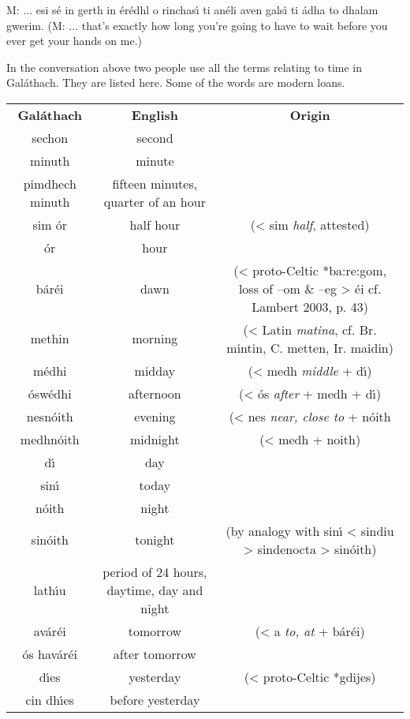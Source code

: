 M: ... esi s\'{e} in gerth in \'{e}r\'{e}dhl o rinchas\'{\i} ti an\'{e}li aven gals\'{\i} ti \'{a}dha to dhalam gwerim.
(M: ... that’s exactly how long you’re going to have to wait before you ever get your hands on me.)


In the conversation above two people use all the terms relating to time in Gal\'{a}thach. They are listed here. Some of the words are modern loans.

\begin{table}[H]
\centering
\begin{tabular}{ccc}
  \toprule
  \textbf{Gal\'{a}thach} & \textbf{English} & \textbf{Origin}\\
  \cmidrule(lr){1-1}\cmidrule(lr){2-2}\cmidrule(lr){3-3}
  sechon & second & \\
  minuth & minute & \\
  pimdhech minuth & fifteen minutes, quarter of an hour\\
  sim \'{o}r & half hour & (< sim \textit{half}, attested)\\
  \'{o}r & hour & \\
  \midrule
  b\'{a}r\'{e}i & dawn & (< proto-Celtic *ba:re:gom, loss of –om \& –eg > \'{e}i cf. Lambert 2003, p. 43)\\
  methin & morning & (< Latin \textit{matina}, cf. Br. mintin, C. metten, Ir. maidin)\\
  m\'{e}dhi & midday & (< medh \textit{middle} + d\'{\i})\\
  \'{o}sw\'{e}dhi & afternoon & (< \'{o}s \textit{after} + medh + d\'{\i})\\
  nesn\'{o}ith & evening & (< nes \textit{near, close to} + n\'{o}ith\\
  medhn\'{o}ith & midnight & (< medh + noith)\\
  \midrule
  d\'{\i} & day & \\
  sin\'{\i} & today & \\
  n\'{o}ith & night & \\
  sin\'{o}ith & tonight & (by analogy with sin\'{\i} < sindiu > sindenocta > sin\'{o}ith)\\
  lath\'{\i}u & period of 24 hours, daytime, day and night & \\
  \midrule
  av\'{a}r\'{e}i & tomorrow & (< a \textit{to, at} + b\'{a}r\'{e}i)\\
  \'{o}s hav\'{a}r\'{e}i & after tomorrow & \\
  d\'{\i}es & yesterday & (< proto-Celtic *gdijes)\\
  cin dh\'{\i}es & before yesterday & \\

\end{tabular}
\end{table}
